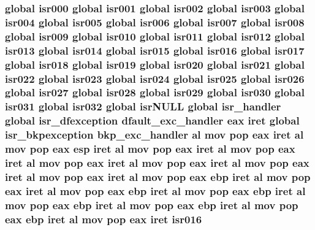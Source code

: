 \subsubsection[{\texorpdfstring{isr016}{isr016}}]{\setlength{\rightskip}{0pt plus 5cm}global {\bf isr000} global {\bf isr001} global {\bf isr002} global {\bf isr003} global {\bf isr004} global {\bf isr005} global {\bf isr006} global {\bf isr007} global {\bf isr008} global {\bf isr009} global {\bf isr010} global {\bf isr011} global {\bf isr012} global {\bf isr013} global {\bf isr014} global {\bf isr015} global isr016 global {\bf isr017} global {\bf isr018} global {\bf isr019} global {\bf isr020} global {\bf isr021} global {\bf isr022} global {\bf isr023} global {\bf isr024} global {\bf isr025} global {\bf isr026} global {\bf isr027} global {\bf isr028} global {\bf isr029} global {\bf isr030} global {\bf isr031} global isr032 global isr\+N\+U\+LL global isr\+\_\+handler global {\bf isr\+\_\+dfexception} {\bf dfault\+\_\+exc\+\_\+handler} eax iret global {\bf isr\+\_\+bkpexception} {\bf bkp\+\_\+exc\+\_\+handler} {\bf al} {\bf mov} pop eax iret {\bf al} {\bf mov} pop eax esp iret {\bf al} {\bf mov} pop eax iret {\bf al} {\bf mov} pop eax iret {\bf al} {\bf mov} pop eax iret {\bf al} {\bf mov} pop eax iret {\bf al} {\bf mov} pop eax iret {\bf al} {\bf mov} pop eax iret {\bf al} {\bf mov} pop eax ebp iret {\bf al} {\bf mov} pop eax iret {\bf al} {\bf mov} pop eax ebp iret {\bf al} {\bf mov} pop eax ebp iret {\bf al} {\bf mov} pop eax ebp iret {\bf al} {\bf mov} pop eax ebp iret {\bf al} {\bf mov} pop eax ebp iret {\bf al} {\bf mov} pop eax iret isr016}\hypertarget{isrs_8as_a5037a27d9191035416c66e5aeaa72e51}{}\label{isrs_8as_a5037a27d9191035416c66e5aeaa72e51}
